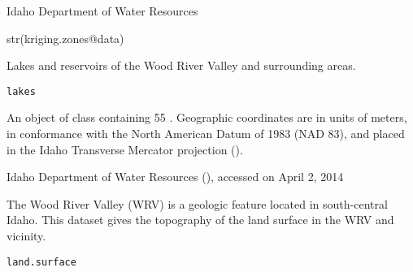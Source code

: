 \documentclass[letterpaper]{book}
\begin{document}
%
\begin{Source}\relax
Idaho Department of Water Resources
\end{Source}
%
\begin{SeeAlso}\relax
{}
\end{SeeAlso}
%
\begin{Examples}
\begin{ExampleCode}
str(kriging.zones@data)
\end{ExampleCode}
\end{Examples}
%
\begin{Description}\relax
Lakes and reservoirs of the Wood River Valley and surrounding areas.
\end{Description}
%
\begin{Usage}
\begin{verbatim}
lakes
\end{verbatim}
\end{Usage}
%
\begin{Format}
An object of  class containing 55 .
Geographic coordinates are in units of meters, in conformance with the North American Datum of 1983 (NAD 83), and placed in the
Idaho Transverse Mercator projection ().
\end{Format}
%
\begin{Source}\relax
Idaho Department of Water Resources (), accessed on April 2, 2014
\end{Source}
%
\begin{Examples}
\end{Examples}
%
\begin{Description}\relax
The Wood River Valley (WRV) is a geologic feature located in south-central Idaho.
This dataset gives the topography of the land surface in the WRV and vicinity.
\end{Description}
%
\begin{Usage}
\begin{verbatim}
land.surface
\end{verbatim}
\end{Usage}
\end{document}
